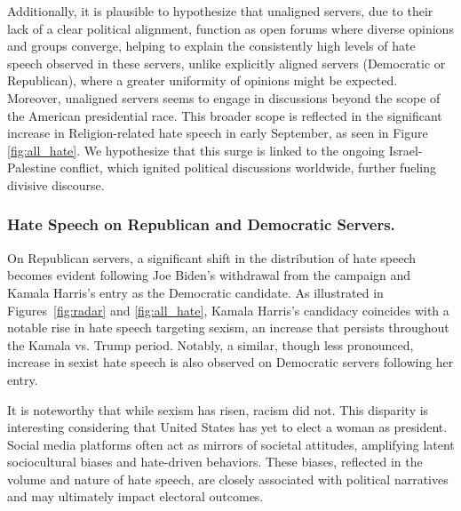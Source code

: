 Additionally, it is plausible to hypothesize that unaligned servers, due to their lack of a clear political alignment, function as open forums where diverse opinions and groups converge, helping to explain the consistently high levels of hate speech observed in these servers, unlike explicitly aligned servers (Democratic or Republican), where a greater uniformity of opinions might be expected. Moreover, unaligned servers seems to engage in discussions beyond the scope of the American presidential race. This broader scope is reflected in the significant increase in Religion-related hate speech in early September, as seen in Figure \ref{fig:all_hate}. We hypothesize that this surge is linked to the ongoing Israel-Palestine conflict, which ignited political discussions worldwide, further fueling divisive discourse.

\subsubsection{Hate Speech on Republican and Democratic Servers. \\}

On Republican servers, a significant shift in the distribution of hate speech becomes evident following Joe Biden's withdrawal from the campaign and Kamala Harris's entry as the Democratic candidate. As illustrated in Figures~\ref{fig:radar} and \ref{fig:all_hate}, Kamala Harris's candidacy coincides with a notable rise in hate speech targeting sexism, an increase that persists throughout the Kamala vs. Trump period. Notably, a similar, though less pronounced, increase in sexist hate speech is also observed on Democratic servers following her entry.

It is noteworthy that while sexism has risen, racism did not. This disparity is interesting considering that United States has yet to elect a woman as president. Social media platforms often act as mirrors of societal attitudes, amplifying latent sociocultural biases and hate-driven behaviors. These biases, reflected in the volume and nature of hate speech, are closely associated with political narratives and may ultimately impact electoral outcomes. 

